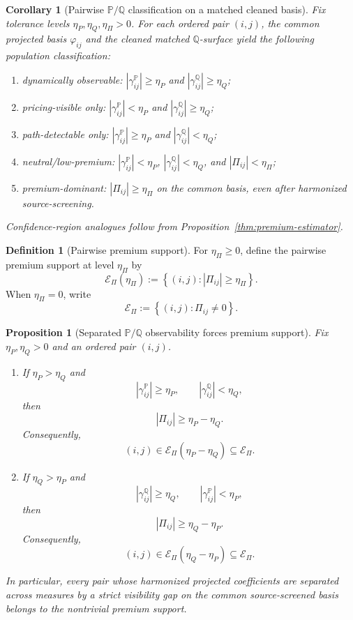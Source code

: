 \documentclass[11pt,a4paper]{amsart}
\theoremstyle{plain}
\newtheorem{proposition}[theorem]{Proposition}
\newtheorem{corollary}[theorem]{Corollary}
\theoremstyle{definition}
\newtheorem{definition}[theorem]{Definition}
\theoremstyle{remark}
\newcommand{\PP}{\mathbb{P}}
\newcommand{\QQ}{\mathbb{Q}}
\newcommand{\cE}{\mathcal{E}}
\begin{document}
\begin{corollary}[Pairwise \(\PP/\QQ\) classification on a matched cleaned basis]\label{cor:premium-class}
Fix tolerance levels \(\eta_P,\eta_Q,\eta_\Pi>0\).  For each ordered pair \((i,j)\), the common
projected basis \(\varphi_{ij}\) and the cleaned matched \(\QQ\)-surface yield the following
population classification:
\begin{enumerate}[label=(\roman*)]
\item \emph{dynamically observable}: \(|\gamma_{ij}^\PP|\ge\eta_P\) and
\(|\gamma_{ij}^\QQ|\ge\eta_Q\);
\item \emph{pricing-visible only}: \(|\gamma_{ij}^\PP|<\eta_P\) and
\(|\gamma_{ij}^\QQ|\ge\eta_Q\);
\item \emph{path-detectable only}: \(|\gamma_{ij}^\PP|\ge\eta_P\) and
\(|\gamma_{ij}^\QQ|<\eta_Q\);
\item \emph{neutral/low-premium}: \(|\gamma_{ij}^\PP|<\eta_P\),
\(|\gamma_{ij}^\QQ|<\eta_Q\), and \(|\Pi_{ij}|<\eta_\Pi\);
\item \emph{premium-dominant}: \(|\Pi_{ij}|\ge\eta_\Pi\) on the common basis, even after
harmonized source-screening.
\end{enumerate}
Confidence-region analogues follow from Proposition~\ref{thm:premium-estimator}.
\end{corollary}

\begin{definition}[Pairwise premium support]\label{def:premium-support}
For \(\eta_\Pi\ge0\), define the pairwise premium support at level \(\eta_\Pi\) by
\[
        \cE_\Pi(\eta_\Pi)
        :=
        \left\{
                (i,j): |\Pi_{ij}|\ge \eta_\Pi
        \right\}.
\]
When \(\eta_\Pi=0\), write
\[
        \cE_\Pi
        :=
        \left\{
                (i,j): \Pi_{ij}\neq0
        \right\}.
\]
\end{definition}

\begin{proposition}[Separated \(\PP/\QQ\) observability forces premium support]\label{prop:premium-support-separated}
Fix \(\eta_P,\eta_Q>0\) and an ordered pair \((i,j)\).
\begin{enumerate}[label=(\roman*)]
\item If \(\eta_P>\eta_Q\) and
\[
        |\gamma_{ij}^\PP|\ge \eta_P,
        \qquad
        |\gamma_{ij}^\QQ|<\eta_Q,
\]
then
\[
        |\Pi_{ij}|
        \ge
        \eta_P-\eta_Q.
\]
Consequently,
\[
        (i,j)\in \cE_\Pi(\eta_P-\eta_Q)\subseteq \cE_\Pi.
\]
\item If \(\eta_Q>\eta_P\) and
\[
        |\gamma_{ij}^\QQ|\ge \eta_Q,
        \qquad
        |\gamma_{ij}^\PP|<\eta_P,
\]
then
\[
        |\Pi_{ij}|
        \ge
        \eta_Q-\eta_P.
\]
Consequently,
\[
        (i,j)\in \cE_\Pi(\eta_Q-\eta_P)\subseteq \cE_\Pi.
\]
\end{enumerate}
In particular, every pair whose harmonized projected coefficients are separated across measures by
a strict visibility gap on the common source-screened basis belongs to the nontrivial premium
support.
\end{proposition}
\end{document}
